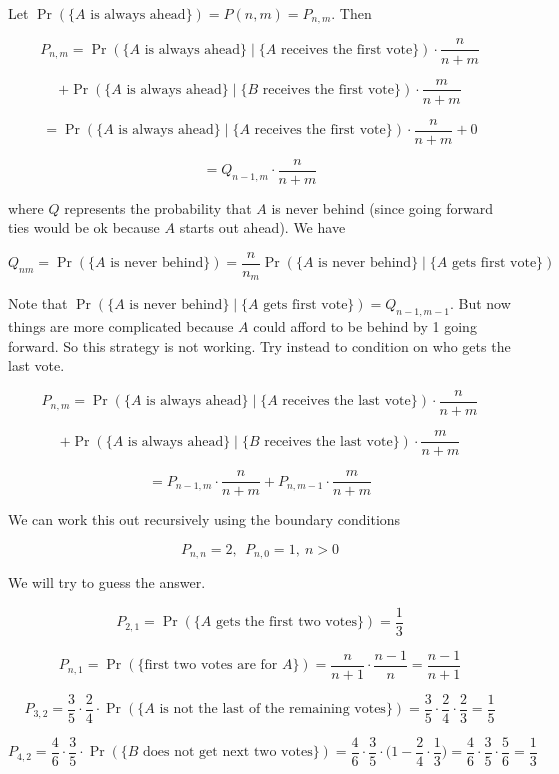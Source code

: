 \begin{solution}
Let \(\Pr(\{A \text{ is always ahead}\}) = P(n,m) = P_{n,m}\). Then

\[
P_{n,m} = \Pr(\{A \text{ is always ahead}\} \mid \{A \text{ receives the first vote} \}) \cdot \frac{n}{n+m} 
\]

\[
+  \Pr(\{A \text{ is always ahead}\} \mid \{B \text{ receives the first vote} \}) \cdot \frac{m}{n+m} 
\]

\[
= \Pr(\{A \text{ is always ahead}\} \mid \{A \text{ receives the first vote} \}) \cdot \frac{n}{n+m} + 0
\]

\[
= Q_{n-1,m} \cdot \frac{n}{n+m}
\]

where \(Q\) represents the probability that \(A\) is never behind (since going forward ties would be ok because \(A\) starts out ahead). We have

\[
Q_{nm} = \Pr(\{A \text{ is never behind}\}) = \frac{n}{n_m} \Pr(\{A \text{ is never behind}\} \mid \{A \text{ gets first vote} \})
\]

Note that \(\Pr(\{A \text{ is never behind}\} \mid \{A \text{ gets first vote} \}) = Q_{n-1, m-1}\). But now things are more complicated because \(A\) could afford to be behind by 1 going forward. So this strategy is not working. Try instead to condition on who gets the last vote. 

\[
P_{n,m} = \Pr(\{A \text{ is always ahead}\} \mid \{A \text{ receives the last vote} \}) \cdot \frac{n}{n+m} 
\]

\[
+  \Pr(\{A \text{ is always ahead}\} \mid \{B \text{ receives the last vote} \}) \cdot \frac{m}{n+m} 
\]

\[
= P_{n-1,m} \cdot \frac{n}{n+m}  +  P_{n,m-1} \cdot \frac{m}{n+m} 
\]

We can work this out recursively using the boundary conditions

\[
P_{n,n} = 2, \ \ P_{n,0} = 1, \ n > 0
\]

We will try to guess the answer. 

\[
P_{2,1} = \Pr(\{A \text{ gets the first two votes} \}) = \frac{1}{3} 
\]

\[
P_{n,1} = \Pr(\{\text{first two votes are for } A\}) = \frac{n}{n+1} \cdot \frac{n-1}{n} = \frac{n-1}{n+1}
\]

\[
P_{3,2} = \frac{3}{5} \cdot \frac{2}{4} \cdot \Pr(\{A \text{ is not the last of the remaining votes}\}) = \frac{3}{5} \cdot \frac{2}{4} \cdot \frac{2}{3} = \frac{1}{5}
\]

\[
P_{4,2} = \frac{4}{6} \cdot \frac{3}{5} \cdot \Pr(\{B \text{ does not get next two votes}\}) = \frac{4}{6} \cdot \frac{3}{5} \cdot \bigg(1 - \frac{2}{4} \cdot \frac{1}{3} \bigg) = \frac{4}{6} \cdot \frac{3}{5} \cdot \frac{5}{6} = \frac{1}{3}
\]


\end{solution}
